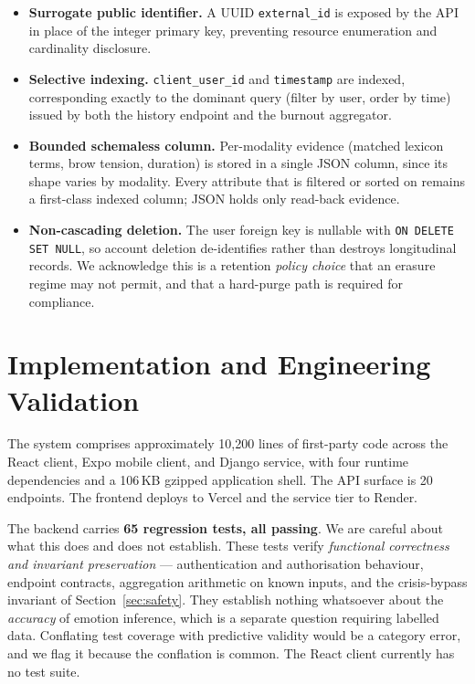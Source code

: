 \documentclass[runningheads]{llncs}
\begin{document}
\begin{itemize}
\item \textbf{Surrogate public identifier.} A UUID \texttt{external\_id} is
exposed by the API in place of the integer primary key, preventing resource
enumeration and cardinality disclosure.
\item \textbf{Selective indexing.} \texttt{client\_user\_id} and
\texttt{timestamp} are indexed, corresponding exactly to the dominant query
(filter by user, order by time) issued by both the history endpoint and the
burnout aggregator.
\item \textbf{Bounded schemaless column.} Per-modality evidence (matched
lexicon terms, brow tension, duration) is stored in a single JSON column,
since its shape varies by modality. Every attribute that is filtered or
sorted on remains a first-class indexed column; JSON holds only read-back
evidence.
\item \textbf{Non-cascading deletion.} The user foreign key is nullable with
\texttt{ON DELETE SET NULL}, so account deletion de-identifies rather than
destroys longitudinal records. We acknowledge this is a retention
\emph{policy choice} that an erasure regime may not permit, and that a
hard-purge path is required for compliance.
\end{itemize}

\section{Implementation and Engineering Validation}

The system comprises approximately 10{,}200 lines of first-party code across
the React client, Expo mobile client, and Django service, with four runtime
dependencies and a 106\,KB gzipped application shell. The API surface is 20
endpoints. The frontend deploys to Vercel and the service tier to Render.

The backend carries \textbf{65 regression tests, all passing}. We are careful
about what this does and does not establish. These tests verify
\emph{functional correctness and invariant preservation} --- authentication and
authorisation behaviour, endpoint contracts, aggregation arithmetic on known
inputs, and the crisis-bypass invariant of Section~\ref{sec:safety}. They
establish nothing whatsoever about the \emph{accuracy} of emotion inference,
which is a separate question requiring labelled data. Conflating test coverage
with predictive validity would be a category error, and we flag it because the
conflation is common. The React client currently has no test suite.
\end{document}
